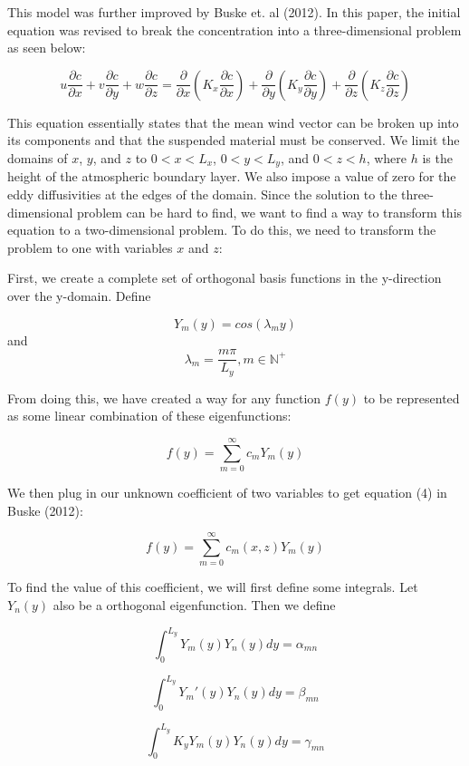 \documentclass{article}
\begin{document}
This model was further improved by Buske et. al (2012). In this paper, the initial equation was revised to break the concentration
into a three-dimensional problem as seen below:

\begin{equation}
    u\frac{\partial c}{\partial x} + v\frac{\partial c}{\partial y} + w \frac{\partial c}{\partial z} 
    = \frac{\partial}{\partial x} (K_x \frac{\partial c}{\partial x}) + \frac{\partial}{\partial y} (K_y \frac{\partial c}{\partial y}) + \frac{\partial}{\partial z} (K_z \frac{\partial c}{\partial z})
\end{equation}

This equation essentially states that the mean wind vector can be broken up into its components and that the suspended material must be conserved.
We limit the domains of $x$, $y$, and $z$ to $0 < x < L_x$, $0 < y < L_y$, and $0 < z < h$, where $h$ is the height of the atmospheric boundary layer. 
We also impose a value of zero for the eddy diffusivities at the edges of the domain. Since the solution to the three-dimensional problem can be hard to find,
we want to find a way to transform this equation to a two-dimensional problem. To do this, we need to transform the problem to one with variables $x$ and $z$:

First, we create a complete set of orthogonal basis functions in the y-direction over the y-domain. Define

$$
    Y_m(y) = cos(\lambda_m y)
$$
and 
$$
    \lambda_m = \frac{m\pi}{L_y}, m \in \mathbb{N}^{+}
$$

From doing this, we have created a way for any function $f(y)$ to be represented as some linear combination of these eigenfunctions:

$$
    f(y) = \sum_{m=0}^{\infty} c_m Y_m(y)
$$

We then plug in our unknown coefficient of two variables to get equation (4) in Buske (2012):

\begin{equation}
    f(y) = \sum_{m=0}^{\infty} c_m(x, z) Y_m(y)
\end{equation}

To find the value of this coefficient, we will first define some integrals. Let $Y_n(y)$ also be a orthogonal eigenfunction. Then we define

$$
    \int_0^{L_y} Y_m(y)Y_n(y) dy = \alpha_{mn}
$$

$$
    \int_0^{L_y} Y_m'(y)Y_n(y) dy = \beta_{mn}
$$

$$
    \int_0^{L_y} K_y Y_m(y)Y_n(y) dy = \gamma_{mn}
$$
\end{document}
